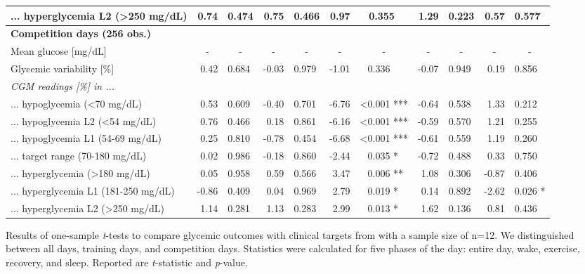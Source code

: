 \documentclass[11pt,a4paper]{article}
\newcommand{\nl}[0]{\textcolor{white}{<}}
\begin{document}
\begin{threeparttable}
\begin{tabular}{@{}l rl rl rl rl rl@{}}
        \hspace{3mm} ... hyperglycemia L2 (>250 mg/dL)    &  0.74 &  0.474 &  0.75 &  0.466 &  0.97 & \nl0.355     &  1.29 &  0.223 &  0.57 &  0.577   \\
        \midrule
        \textbf{Competition days (256 obs.)}\\
        Mean glucose [mg/dL] &\multicolumn{1}{c}{-} & \multicolumn{1}{c}{-} & \multicolumn{1}{c}{-} & \multicolumn{1}{c}{-} & \multicolumn{1}{c}{-} & \multicolumn{1}{c}{-} & \multicolumn{1}{c}{-} & \multicolumn{1}{c}{-} & \multicolumn{1}{c}{-} & \multicolumn{1}{c}{-}\\
        Glycemic variability [\%]                         &  0.42 &  0.684 & -0.03 &  0.979 & -1.01 & \nl0.336     & -0.07 &  0.949 &  0.19 &  0.856   \\
        \textit{CGM readings [\%] in ...} \\
        ... hypoglycemia (<70 mg/dL)                      &  0.53 &  0.609 & -0.40 &  0.701 & -6.76 &   <0.001 *** & -0.64 &  0.538 &  1.33 &  0.212   \\
        \hspace{3mm} ... hypoglycemia L2 (<54 mg/dL)      &  0.76 &  0.466 &  0.18 &  0.861 & -6.16 &   <0.001 *** & -0.59 &  0.570 &  1.21 &  0.255   \\
        \hspace{3mm} ... hypoglycemia L1 (54-69 mg/dL)    &  0.25 &  0.810 & -0.78 &  0.454 & -6.68 &   <0.001 *** & -0.61 &  0.559 &  1.19 &  0.260   \\
        ... target range (70-180 mg/dL)                   &  0.02 &  0.986 & -0.18 &  0.860 & -2.44 & \nl0.035 *   & -0.72 &  0.488 &  0.33 &  0.750   \\
        ... hyperglycemia (>180 mg/dL)                    &  0.05 &  0.958 &  0.59 &  0.566 &  3.47 & \nl0.006 **  &  1.08 &  0.306 & -0.87 &  0.406   \\
        \hspace{3mm} ... hyperglycemia L1 (181-250 mg/dL) & -0.86 &  0.409 &  0.04 &  0.969 &  2.79 & \nl0.019 *   &  0.14 &  0.892 & -2.62 &  0.026 * \\
        \hspace{3mm} ... hyperglycemia L2 (>250 mg/dL)    &  1.14 &  0.281 &  1.13 &  0.283 &  2.99 & \nl0.013 *   &  1.62 &  0.136 &  0.81 &  0.436   \\
        \bottomrule
    \end{tabular}
    \begin{tablenotes}
    \item \footnotesize {Results of one-sample \textit{t}-tests to compare glycemic outcomes with clinical targets from \citet{31177185} with a sample size of n=12. We distinguished between all days, training days, and competition days. Statistics were calculated for five phases of the day: entire day, wake, exercise, recovery, and sleep. Reported are \textit{t}-statistic and \textit{p}-value.}
    \vspace{1cm}
    \end{tablenotes}
\end{threeparttable}
\end{document}
